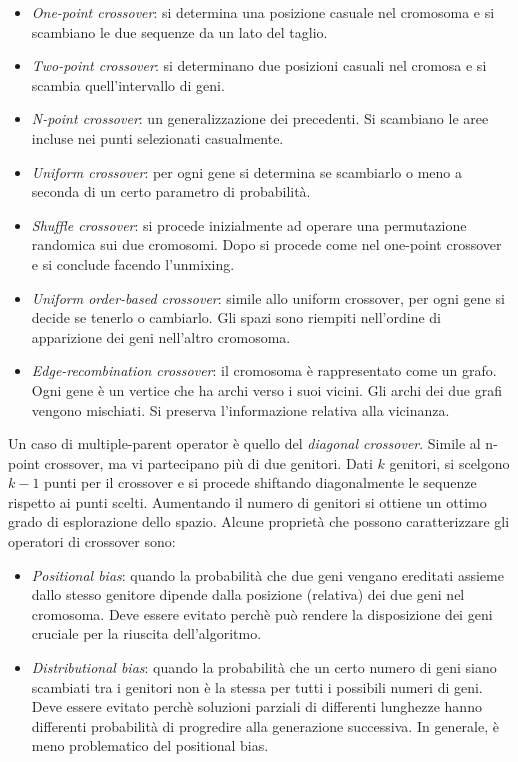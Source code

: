 \documentclass[10pt,a4paper]{article}
\begin{document}
\begin{itemize}
\item{\emph{One-point crossover}: si determina una posizione casuale nel cromosoma e si scambiano le due sequenze da un lato del taglio.}
\item{\emph{Two-point crossover}: si determinano due posizioni casuali nel cromosa e si scambia quell'intervallo di geni.}
\item{\emph{N-point crossover}: un generalizzazione dei precedenti. Si scambiano le aree incluse nei punti selezionati casualmente.}
\item{\emph{Uniform crossover}: per ogni gene si determina se scambiarlo o meno a seconda di un certo parametro di probabilità.}
\item{\emph{Shuffle crossover}: si procede inizialmente ad operare una permutazione randomica sui due cromosomi. Dopo si procede come nel one-point crossover e si conclude facendo l'unmixing.}
\item{\emph{Uniform order-based crossover}: simile allo uniform crossover, per ogni gene si decide se tenerlo o cambiarlo. Gli spazi sono riempiti nell'ordine di apparizione dei geni nell'altro cromosoma.}
\item{\emph{Edge-recombination crossover}: il cromosoma è rappresentato come un grafo. Ogni gene è un vertice che ha archi verso i suoi vicini. Gli archi dei due grafi vengono mischiati. Si preserva l'informazione relativa alla vicinanza.}
\end{itemize}

Un caso di multiple-parent operator è quello del \emph{diagonal crossover}. Simile al n-point crossover, ma vi partecipano più di due genitori. Dati $k$ genitori, si scelgono $k-1$ punti per il crossover e si procede shiftando diagonalmente le sequenze rispetto ai punti scelti. Aumentando il numero di genitori si ottiene un ottimo grado di esplorazione dello spazio. Alcune proprietà che possono caratterizzare gli operatori di crossover sono:

\begin{itemize}
\item{\emph{Positional bias}: quando la probabilità che due geni vengano ereditati assieme dallo stesso genitore dipende dalla posizione (relativa) dei due geni nel cromosoma. Deve essere evitato perchè può rendere la disposizione dei geni cruciale per la riuscita dell'algoritmo.}
\item{\emph{Distributional bias}: quando la probabilità che un certo numero di geni siano scambiati tra i genitori non è la stessa per tutti i possibili numeri di geni. Deve essere evitato perchè soluzioni parziali di differenti lunghezze hanno differenti probabilità di progredire alla generazione successiva. In generale, è meno problematico del positional bias.}
\end{itemize}
\end{document}
